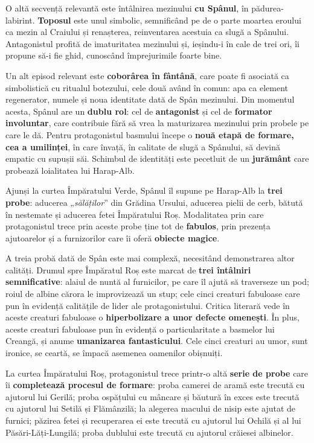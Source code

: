 \documentclass{article}
\newcommand{\qu}[1]{„\emph{#1}”}
\begin{document}
O altă secvență relevantă este întâlnirea mezinului \textbf{cu Spânul}, în pădurea-labirint. \textbf{Toposul} este unul simbolic, semnificând pe de o parte moartea eroului ca mezin al Craiului și renașterea, reinventarea acestuia ca slugă a Spânului. Antagonistul profită de imaturitatea mezinului și, ieșindu-i în cale de trei ori, îi propune să-i fie ghid, cunoscând împrejurimile foarte bine.

Un alt episod relevant este \textbf{coborârea în fântână}, care poate fi asociată ca simbolistică cu ritualul botezului, cele două având în comun: apa ca element regenerator, numele și noua identitate dată de Spân mezinului. Din momentul acesta, Spânul are un \textbf{dublu rol}: cel de \textbf{antagonist} și cel de \textbf{formator involuntar}, care contribuie fără să vrea la maturizarea mezinului prin probele pe care le dă. Pentru protagonistul basmului începe o \textbf{nouă etapă de formare, cea a umilinței}, în care învață, în calitate de slugă a Spânului, să devină empatic cu supușii săi. Schimbul de identități este pecetluit de un \textbf{jurământ} care probează loialitatea lui Harap-Alb.

Ajunși la curtea Împăratului Verde, Spânul îl supune pe Harap-Alb la \textbf{trei probe}: aducerea \qu{sălăților} din Grădina Ursului, aducerea pielii de cerb, bătută în nestemate și aducerea fetei Împăratului Roș. Modalitatea prin care protagonistul trece prin aceste probe ține tot de \textbf{fabulos}, prin prezența ajutoarelor și a furnizorilor care îi oferă \textbf{obiecte magice}.

A treia probă dată de Spân este mai complexă, necesitând demonstrarea altor calități. Drumul spre Împăratul Roș este marcat de \textbf{trei întâlniri semnificative}: alaiul de nuntă al furnicilor, pe care îl ajută să traverseze un pod; roiul de albine cărora le improvizează un stup; cele cinci creaturi fabuloase care pun în evidență calitățile de lider ale protagonistului. Critica literară vede în aceste creaturi fabuloase o \textbf{hiperbolizare a unor defecte omenești}. În plus, aceste creaturi fabuloase pun în evidență o particularitate a basmelor lui Creangă, și anume \textbf{umanizarea fantasticului}. Cele cinci creaturi au umor, sunt ironice, se ceartă, se împacă asemenea oamenilor obișnuiți.

La curtea Împăratului Roș, protagonistul trece printr-o altă \textbf{serie de probe} care îi \textbf{completează procesul de formare}: proba camerei de aramă este trecută cu ajutorul lui Gerilă; proba ospățului cu mâncare și băutură în exces este trecută cu ajutorul lui Setilă și Flămânzilă; la alegerea macului de nisip este ajutat de furnici; păzirea fetei și recuperarea ei este trecută cu ajutorul lui Ochilă și al lui Păsări-Lăți-Lungilă; proba dublului este trecută cu ajutorul crăiesei albinelor.
\end{document}

